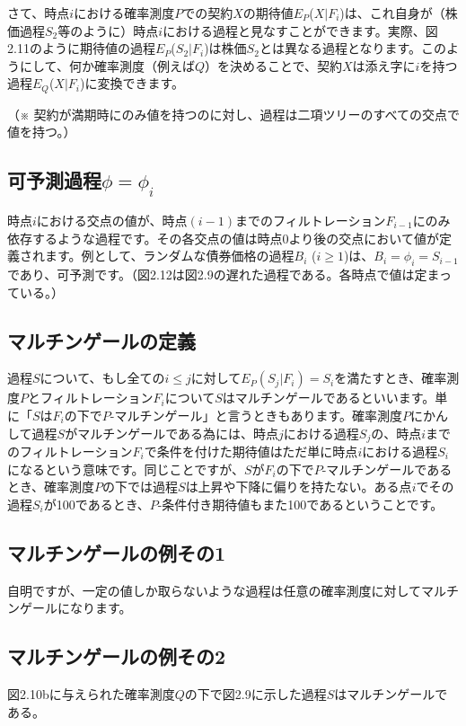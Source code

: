 \documentclass[uplatex,a4j,12pt,dvipdfmx]{jsarticle}
\begin{document}
さて、時点$i$における確率測度$P$での契約$X$の期待値$E_P$($X|F_i$)は、これ自身が（株価過程$S_2$等のように）時点$i$における過程と見なすことができます。実際、図2.11のように期待値の過程$E_P$($S_2|F_i$)は株価$S_2$とは異なる過程となります。このようにして、何か確率測度（例えば$Q$）を決めることで、契約$X$は添え字に$i$を持つ過程$E_Q$($X|F_i$)に変換できます。

（※ 契約が満期時にのみ値を持つのに対し、過程は二項ツリーのすべての交点で値を持つ。）

\subsection{可予測過程$\phi=\phi_{i}$}
時点$i$における交点の値が、時点$(i-1)$までのフィルトレーション$F_{i-1}$にのみ依存するような過程です。その各交点の値は時点0より後の交点において値が定義されます。例として、ランダムな債券価格の過程$B_i$ ($i \ge 1$)は、$B_i = \phi_i = S_{i-1}$であり、可予測です。（図2.12は図2.9の遅れた過程である。各時点で値は定まっている。）

\subsection{マルチンゲールの定義}
過程$S$について、もし全ての$i \le j$に対して$E_P( S_j | F_i ) = S_i$を満たすとき、確率測度$P$とフィルトレーション$F_i$について$S$はマルチンゲールであるといいます。単に「$S$は$F_i$の下で$P$-マルチンゲール」と言うときもあります。確率測度$P$にかんして過程$S$がマルチンゲールである為には、時点$j$における過程$S_j$の、時点$i$までのフィルトレーション$F_i$で条件を付けた期待値はただ単に時点$i$における過程$S_i$になるという意味です。同じことですが、$S$が$F_i$の下で$P$-マルチンゲールであるとき、確率測度$P$の下では過程$S$は上昇や下降に偏りを持たない。ある点$i$でその過程$S_i$が100であるとき、$P$-条件付き期待値もまた100であるということです。

\subsection{マルチンゲールの例その1}
自明ですが、一定の値しか取らないような過程は任意の確率測度に対してマルチンゲールになります。

\subsection{マルチンゲールの例その2}
図2.10bに与えられた確率測度$Q$の下で図2.9に示した過程$S$はマルチンゲールである。
\end{document}
